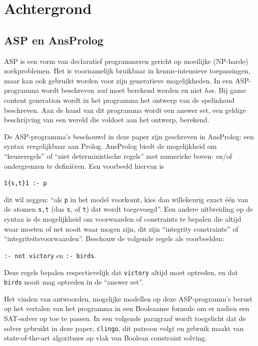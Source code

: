 \documentclass{article}
\begin{document}
\section{Achtergrond}
	\subsection{ASP en AnsProlog}
ASP is een vorm van declaratief programmeren gericht op moeilijke (NP-harde) zoekproblemen. Het is voornamelijk bruikbaar in kennis-intensieve toepassingen, maar kan ook gebruikt worden voor zijn generatieve mogelijkheden. In een ASP-programma wordt beschreven \textit{wat} moet berekend worden en niet \textit{hoe}. Bij game content generation wordt in het programma het ontwerp van de spelinhoud beschreven. Aan de hand van dit programma wordt een answer set, een geldige beschrijving van een wereld die voldoet aan het ontwerp, berekend.

De ASP-programma's beschouwd in deze paper zijn geschreven in AnsProlog: een syntax vergelijkbaar aan Prolog. AnsProlog biedt de mogelijkheid om ``keuzeregels'' of ``niet deterministische regels'' met numerieke boven- en/of ondergrenzen te defini\"eren. Een voorbeeld hiervan is 

\begin{center}
\texttt{1\{s,t\}1 :- p} 
\end{center}

\noindent dit wil zeggen: ``als \texttt{p} in het model voorkomt, kies dan willekeurig exact \'e\'en van de atomen \texttt{s,t} (dus \texttt{s}, of \texttt{t}) dat wordt toegevoegd''. Een andere uitbreiding op de syntax is de mogelijkheid om voorwaarden of constraints te bepalen die altijd waar moeten of net nooit waar mogen zijn, dit zijn ``integrity constraints'' of ``integriteitsvoorwaarden''. Beschouw de volgende regels als voorbeelden:

\begin{center}
\texttt{:- not victory} en \texttt{:- birds}.
\end{center}

Deze regels bepalen respectievelijk dat \texttt{victory} altijd moet optreden, en dat \texttt{birds} nooit mag optreden in de ``answer set''.

Het vinden van antwoorden, mogelijke modellen op deze ASP-programm's berust op het vertalen van het programma in een Booleaanse formule om er nadien een SAT-solver op toe te passen. In een volgende paragraaf wordt toegelicht dat de solver gebruikt in deze paper, \texttt{clingo}, dit patroon volgt en gebruik maakt van state-of-the-art algoritmes op vlak van Boolean constraint solving.
\end{document}
